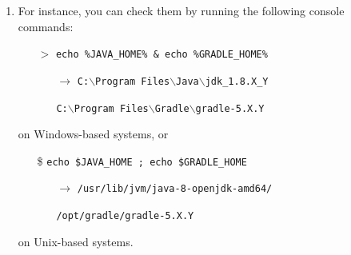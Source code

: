\documentclass[handout]{beamer}\mode<presentation>{\usetheme{AMSCesenaPurpleAndGold}}
\begin{document}
\begin{frame}[allowframebreaks]
\begin{enumerate}
    \vspace{.5cm}
    
    \item For instance, you can check them by running the following console commands:
    \begin{itemize}
        \item[$>$] \texttt{echo \alert{\%}JAVA\_HOME\alert{\%} \& echo \alert{\%}GRADLE\_HOME\alert{\%}}
        \begin{itemize}
            \item[$\rightarrow$] \texttt{C:$\backslash$Program Files$\backslash$Java$\backslash$jdk\_1.8.X\_Y} 
            \item[] \texttt{C:$\backslash$Program Files$\backslash$Gradle$\backslash$gradle-5.X.Y} 
        \end{itemize}
    \end{itemize}
    on Windows-based systems, or
    \begin{itemize}
        \item[\$] \texttt{echo \alert{\$}JAVA\_HOME ; echo \alert{\$}GRADLE\_HOME}
        \begin{itemize}
            \item[$\rightarrow$] \texttt{/usr/lib/jvm/java-8-openjdk-amd64/}
            \item[] \texttt{/opt/gradle/gradle-5.X.Y}
        \end{itemize}
    \end{itemize}
    on Unix-based systems.
    
   \framebreak
    

\end{enumerate}
\end{frame}
\end{document}
